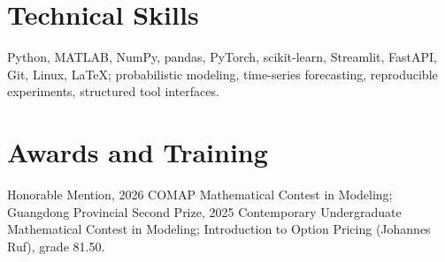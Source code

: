 \documentclass[10pt]{article}
\begin{document}
\section*{Technical Skills}
Python, MATLAB, NumPy, pandas, PyTorch, scikit-learn, Streamlit, FastAPI, Git, Linux, LaTeX; probabilistic modeling, time-series forecasting, reproducible experiments, structured tool interfaces.
\section*{Awards and Training}
Honorable Mention, 2026 COMAP Mathematical Contest in Modeling; Guangdong Provincial Second Prize, 2025 Contemporary Undergraduate Mathematical Contest in Modeling; Introduction to Option Pricing (Johannes Ruf), grade 81.50.
\end{document}
